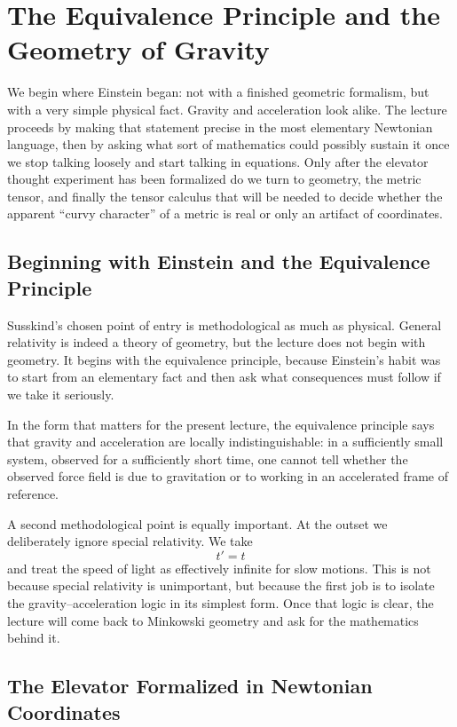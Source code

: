 \chapter{The Equivalence Principle and the Geometry of Gravity}

We begin where Einstein began: not with a finished geometric formalism, but with a very simple physical fact.  Gravity and acceleration look alike.  The lecture proceeds by making that statement precise in the most elementary Newtonian language, then by asking what sort of mathematics could possibly sustain it once we stop talking loosely and start talking in equations.  Only after the elevator thought experiment has been formalized do we turn to geometry, the metric tensor, and finally the tensor calculus that will be needed to decide whether the apparent ``curvy character'' of a metric is real or only an artifact of coordinates.

\section{Beginning with Einstein and the Equivalence Principle}

Susskind's chosen point of entry is methodological as much as physical.  General relativity is indeed a theory of geometry, but the lecture does not begin with geometry.  It begins with the equivalence principle, because Einstein's habit was to start from an elementary fact and then ask what consequences must follow if we take it seriously.

\begin{definition}
In the form that matters for the present lecture, the equivalence principle says that gravity and acceleration are locally indistinguishable: in a sufficiently small system, observed for a sufficiently short time, one cannot tell whether the observed force field is due to gravitation or to working in an accelerated frame of reference.
\end{definition}

A second methodological point is equally important.  At the outset we deliberately ignore special relativity.  We take
\[
t' = t
\]
and treat the speed of light as effectively infinite for slow motions.  This is not because special relativity is unimportant, but because the first job is to isolate the gravity--acceleration logic in its simplest form.  Once that logic is clear, the lecture will come back to Minkowski geometry and ask for the mathematics behind it.

\section{The Elevator Formalized in Newtonian Coordinates}

